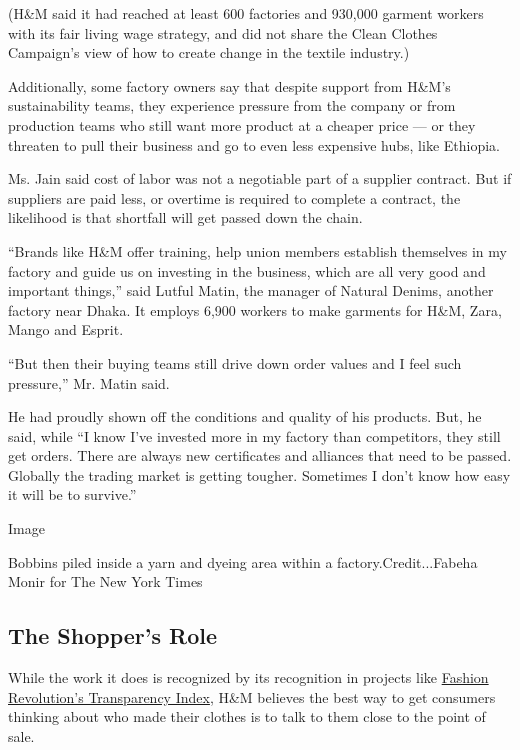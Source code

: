 (H\&M said it had reached at least 600 factories and 930,000 garment
workers with its fair living wage strategy, and did not share the Clean
Clothes Campaign's view of how to create change in the textile
industry.)

Additionally, some factory owners say that despite support from H\&M's
sustainability teams, they experience pressure from the company or from
production teams who still want more product at a cheaper price --- or
they threaten to pull their business and go to even less expensive hubs,
like Ethiopia.

Ms. Jain said cost of labor was not a negotiable part of a supplier
contract. But if suppliers are paid less, or overtime is required to
complete a contract, the likelihood is that shortfall will get passed
down the chain.

``Brands like H\&M offer training, help union members establish
themselves in my factory and guide us on investing in the business,
which are all very good and important things,'' said Lutful Matin, the
manager of Natural Denims, another factory near Dhaka. It employs 6,900
workers to make garments for H\&M, Zara, Mango and Esprit.

``But then their buying teams still drive down order values and I feel
such pressure,'' Mr. Matin said.

He had proudly shown off the conditions and quality of his products.
But, he said, while ``I know I've invested more in my factory than
competitors, they still get orders. There are always new certificates
and alliances that need to be passed. Globally the trading market is
getting tougher. Sometimes I don't know how easy it will be to
survive.''

Image

Bobbins piled inside a yarn and dyeing area within a
factory.Credit...Fabeha Monir for The New York Times

\hypertarget{the-shoppers-role}{%
\subsection{The Shopper's Role}\label{the-shoppers-role}}

While the work it does is recognized by its recognition in projects like
\href{https://issuu.com/fashionrevolution/docs/fashion_transparency_index_2019?e=25766662/69342298}{Fashion
Revolution's Transparency Index}, H\&M believes the best way to get
consumers thinking about who made their clothes is to talk to them close
to the point of sale.


